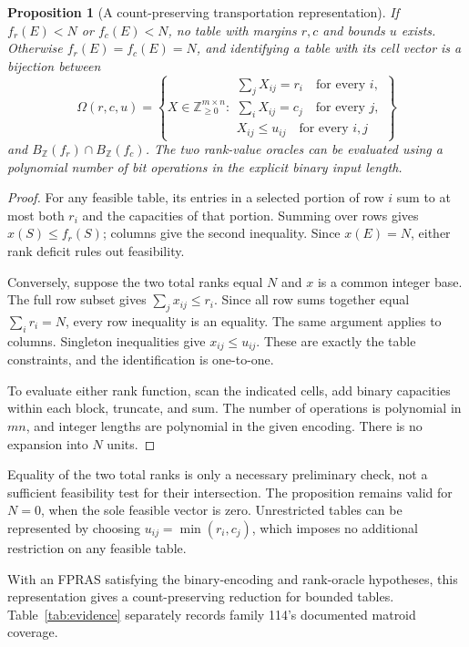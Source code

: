 \documentclass[11pt]{article}
\newtheorem{proposition}{Proposition}
\newcommand{\Z}{\mathbb Z}
\begin{document}
\begin{proposition}[A count-preserving transportation representation]
If \(f_r(E)<N\) or \(f_c(E)<N\), no table with margins \(r,c\) and bounds \(u\) exists.
Otherwise \(f_r(E)=f_c(E)=N\), and identifying a table with its cell vector is a bijection between
\[
 \Omega(r,c,u)=
 \left\{X\in\Z_{\geq0}^{m\times n}:
 \begin{array}{l}
 \sum_jX_{ij}=r_i\quad\text{for every }i,\\
 \sum_iX_{ij}=c_j\quad\text{for every }j,\\
 X_{ij}\leq u_{ij}\quad\text{for every }i,j
 \end{array}\right\}
\]
and \(B_{\Z}(f_r)\cap B_{\Z}(f_c)\).
The two rank-value oracles can be evaluated using a polynomial number of bit operations in the explicit binary input length.
\end{proposition}
\begin{proof}
For any feasible table, its entries in a selected portion of row \(i\) sum to at most both \(r_i\) and the capacities of that portion. Summing over rows gives \(x(S)\leq f_r(S)\); columns give the second inequality. Since \(x(E)=N\), either rank deficit rules out feasibility.

Conversely, suppose the two total ranks equal \(N\) and \(x\) is a common integer base. The full row subset gives \(\sum_jx_{ij}\leq r_i\). Since all row sums together equal \(\sum_i r_i=N\), every row inequality is an equality. The same argument applies to columns. Singleton inequalities give \(x_{ij}\leq u_{ij}\). These are exactly the table constraints, and the identification is one-to-one.

To evaluate either rank function, scan the indicated cells, add binary capacities within each block, truncate, and sum. The number of operations is polynomial in \(mn\), and integer lengths are polynomial in the given encoding. There is no expansion into \(N\) units.
\end{proof}

Equality of the two total ranks is only a necessary preliminary check, not a sufficient feasibility test for their intersection. The proposition remains valid for \(N=0\), when the sole feasible vector is zero. Unrestricted tables can be represented by choosing \(u_{ij}=\min(r_i,c_j)\), which imposes no additional restriction on any feasible table.

With an FPRAS satisfying the binary-encoding and rank-oracle hypotheses, this representation gives a count-preserving reduction for bounded tables. Table~\ref{tab:evidence} separately records family 114's documented matroid coverage.
\end{document}
